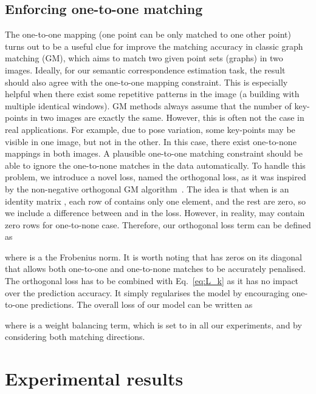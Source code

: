 \documentclass[10pt,twocolumn,letterpaper]{article}
\begin{document}
\subsection{Enforcing one-to-one matching}
The one-to-one mapping (\ie one point can be only matched to one other point) turns out to be a useful clue for improve the matching accuracy in classic graph matching (GM)\cite{Zanfir_CVPR18_DeepGM,Jiang_AAAI17_NOGM}, which aims to match two given point sets (graphs) in two images.
Ideally, for our semantic correspondence estimation task, the result should also agree with the one-to-one mapping constraint.
This is especially helpful when there exist some repetitive patterns in the image (\eg a building with multiple identical windows).
GM methods always assume that the number of  key-points in two images are exactly the same.
However, this is often not the case in real applications.
For example, due to pose variation, some key-points may be visible in one image, but not in the other.
In this case, there exist one-to-none mappings in both images.
A plausible one-to-one matching constraint should be able to ignore the one-to-none matches in the data automatically.
To handle this problem, we introduce a novel loss, named the orthogonal loss, as it was inspired by the non-negative orthogonal GM algorithm~\cite{Jiang_AAAI17_NOGM}.
The idea is that when  is an identity matrix , each row of  contains only one element, and the rest are zero, so we include a difference between  and  in the loss. However, in reality,  may contain zero rows for one-to-none case. Therefore, our orthogonal loss term can be defined as 

where  is a the Frobenius norm.  It is worth noting that  has zeros on its diagonal that allows both one-to-one and one-to-none matches to be accurately penalised.
The orthogonal loss has to be combined with Eq.~\ref{eq:L_k} as it has no impact over the prediction accuracy.
It simply regularises the model by encouraging one-to-one predictions.
The overall loss of our model can be written as 

where  is a weight balancing term, which is set to  in all our experiments, and  by considering both matching directions.


 \section{Experimental results}
\end{document}
